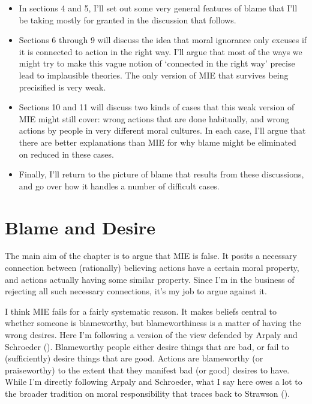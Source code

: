 \documentclass[
  10pt,
  letterpaper,
  twoside]{scrbook}
\providecommand{\tightlist}{%
  \setlength{\itemsep}{0pt}\setlength{\parskip}{0pt}}\usepackage{longtable,booktabs,array}
\begin{document}
\begin{itemize}
\tightlist
\item
  In sections 4 and 5, I'll set out some very general features of blame
  that I'll be taking mostly for granted in the discussion that follows.
\item
  Sections 6 through 9 will discuss the idea that moral ignorance only
  excuses if it is connected to action in the right way. I'll argue that
  most of the ways we might try to make this vague notion of `connected
  in the right way' precise lead to implausible theories. The only
  version of MIE that survives being precisified is very weak.
\item
  Sections 10 and 11 will discuss two kinds of cases that this weak
  version of MIE might still cover: wrong actions that are done
  habitually, and wrong actions by people in very different moral
  cultures. In each case, I'll argue that there are better explanations
  than MIE for why blame might be eliminated on reduced in these cases.
\item
  Finally, I'll return to the picture of blame that results from these
  discussions, and go over how it handles a number of difficult cases.
\end{itemize}

\section{Blame and Desire}\label{blameanddesire}

The main aim of the chapter is to argue that MIE is false. It posits a
necessary connection between (rationally) believing actions have a
certain moral property, and actions actually having some similar
property. Since I'm in the business of rejecting all such necessary
connections, it's my job to argue against it.

I think MIE fails for a fairly systematic reason. It makes beliefs
central to whether someone is blameworthy, but blameworthiness is a
matter of having the wrong desires. Here I'm following a version of the
view defended by Arpaly and Schroeder
(). Blameworthy people either
desire things that are bad, or fail to (sufficiently) desire things that
are good. Actions are blameworthy (or praiseworthy) to the extent that
they manifest bad (or good) desires to have. While I'm directly
following Arpaly and Schroeder, what I say here owes a lot to the
broader tradition on moral responsibility that traces back to Strawson
().
\end{document}

